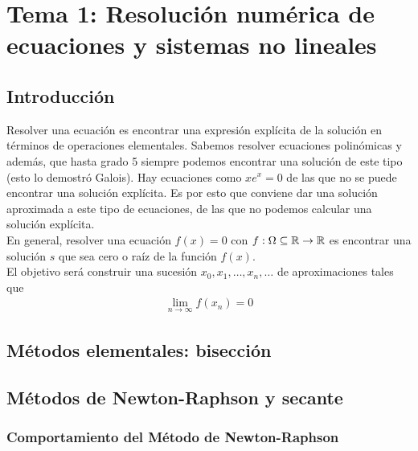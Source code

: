 \chapter{Tema 1: Resolución numérica de ecuaciones y sistemas no lineales}

\section{Introducción}

Resolver una ecuación es encontrar una expresión explícita de la solución en términos de operaciones elementales. Sabemos resolver ecuaciones polinómicas y además, que hasta grado 5 siempre podemos encontrar una solución de este tipo (esto lo demostró Galois). Hay ecuaciones como $xe^x=0$ de las que no se puede encontrar una solución explícita. Es por esto que conviene dar una solución aproximada a este tipo de ecuaciones, de las que no podemos calcular una solución explícita.\\

En general, resolver una ecuación $f(x)=0$ con $f:\Omega \subseteq \mathbb{R} \to \mathbb{R}$ es encontrar una solución $s$ que sea cero o raíz de la función $f(x)$.\\

El objetivo será construir una sucesión $x_0, x_1,\dots,x_n,\dots$ de aproximaciones tales que 
\begin{align*}
    \lim\limits_{n\to \infty} f(x_n) = 0
\end{align*}

\section{Métodos elementales: bisección}

\section{Métodos de Newton-Raphson y secante}

\subsection{Comportamiento del Método de Newton-Raphson}